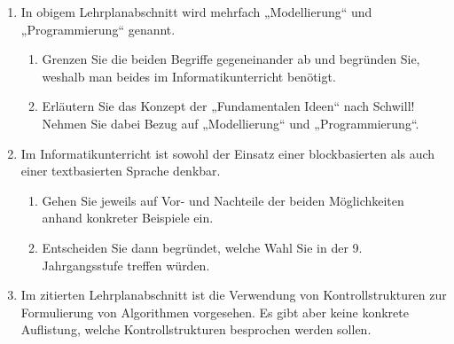 \documentclass{lehramt-informatik-aufgabe}
\begin{document}
\begin{enumerate}


\item In obigem Lehrplanabschnitt wird mehrfach „Modellierung“ und
„Programmierung“ genannt.

\begin{enumerate}

\item Grenzen Sie die beiden Begriffe gegeneinander ab und begründen
Sie, weshalb man beides im Informatikunterricht benötigt.


\item Erläutern Sie das Konzept der „Fundamentalen Ideen“ nach Schwill!
Nehmen Sie dabei Bezug auf „Modellierung“ und „Programmierung“.
\end{enumerate}


\item Im Informatikunterricht ist sowohl der Einsatz einer
blockbasierten als auch einer textbasierten Sprache denkbar.
\begin{enumerate}


\item Gehen Sie jeweils auf Vor- und Nachteile der beiden Möglichkeiten
anhand konkreter Beispiele ein.


\item Entscheiden Sie dann begründet, welche Wahl Sie in der 9.
Jahrgangsstufe treffen würden.

\end{enumerate}


\item Im zitierten Lehrplanabschnitt ist die Verwendung von
Kontrollstrukturen zur Formulierung von Algorithmen vorgesehen. Es gibt
aber keine konkrete Auflistung, welche Kontrollstrukturen besprochen
werden sollen.
\begin{enumerate}


\end{enumerate}
\end{enumerate}
\end{document}
